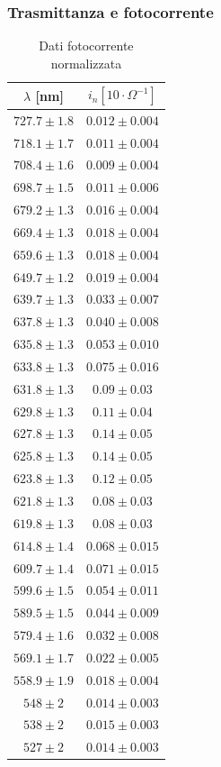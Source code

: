 \subsubsection{Trasmittanza e fotocorrente}


\begin{table}[H]
\centering
\begin{tabular}{|c|c|}
\hline
$\lambda$ [nm] & $i_n [10\cdot \Omega^{-1}]$  \\\hline\hline

$727.7 \pm 1.8$ & $0.012 \pm 0.004$ \\ \hline
$718.1 \pm 1.7$ & $0.011 \pm 0.004$ \\ \hline
$708.4 \pm 1.6$ & $0.009 \pm 0.004$ \\\hline
$698.7 \pm 1.5$ & $0.011 \pm 0.006$ \\\hline
$679.2 \pm 1.3$ & $0.016 \pm 0.004$ \\\hline
$669.4 \pm 1.3$ & $0.018 \pm 0.004$ \\\hline
$659.6 \pm 1.3$ & $0.018 \pm 0.004$ \\\hline
$649.7 \pm 1.2$ & $0.019 \pm 0.004$ \\\hline
$639.7 \pm 1.3$ & $0.033 \pm 0.007$ \\\hline
$637.8 \pm 1.3$ & $0.040 \pm 0.008$ \\\hline
$635.8 \pm 1.3$ & $0.053 \pm 0.010$ \\\hline
$633.8 \pm 1.3$ & $0.075 \pm 0.016$ \\\hline
$631.8 \pm 1.3$ & $0.09 \pm 0.03$ \\\hline
$629.8 \pm 1.3$ & $0.11 \pm 0.04$ \\\hline
$627.8 \pm 1.3$ & $0.14 \pm 0.05$ \\\hline
$625.8 \pm 1.3$ & $0.14 \pm 0.05$ \\\hline
$623.8 \pm 1.3$ & $0.12 \pm 0.05$ \\ \hline
$621.8 \pm 1.3$ & $0.08 \pm 0.03$ \\ \hline
$619.8 \pm 1.3$ & $0.08 \pm 0.03$ \\ \hline
$614.8 \pm 1.4$ & $0.068 \pm 0.015$ \\ \hline
$609.7 \pm 1.4$ & $0.071 \pm 0.015$ \\ \hline
$599.6 \pm 1.5$ & $0.054 \pm 0.011$ \\ \hline
$589.5 \pm 1.5$ & $0.044 \pm 0.009$ \\ \hline
$579.4 \pm 1.6$ & $0.032 \pm 0.008$ \\ \hline
$569.1 \pm 1.7$ & $0.022 \pm 0.005$ \\ \hline
$558.9 \pm 1.9$ & $0.018 \pm 0.004$ \\ \hline
$548 \pm 2$ & $0.014 \pm 0.003$ \\ \hline
$538 \pm 2$ & $0.015 \pm 0.003$ \\ \hline
$527 \pm 2$ & $0.014 \pm 0.003$ \\ \hline
\end{tabular}
\caption{Dati fotocorrente normalizzata}
\label{tab:fotocorrente}
\end{table}

